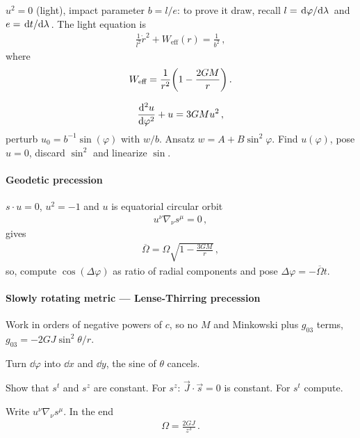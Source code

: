 \documentclass[main.tex]{subfiles}
\begin{document}
\(u^2= 0\) (light), impact parameter \(b = l/e\): to prove it draw, recall \(l = \dv*{\varphi }{\lambda }\) and \(e =
\dv*{t}{\lambda }\). 
The light equation is 
%
\begin{align}
\frac{1}{l^2} \dot{r}^2  + W _{\text{eff}} (r)
= \frac{1}{b^2}
\,,
\end{align}
%
where 
%
\begin{align}
W _{\text{eff}} = \frac{1}{r^2} \qty(1 - \frac{2GM}{r})
\,.
\end{align}

%
\begin{align}
\dv[2]{u}{\varphi } + u = 3GM u^2
\,,
\end{align}
%
perturb \(u_0 = b^{-1} \sin(\varphi )\) with \(w/b\). 
Ansatz \(w = A + B \sin^2\varphi \). Find \(u(\varphi )\), 
pose \(u=0\), discard \(\sin^2\) and linearize \(\sin\). 

\paragraph{Geodetic precession}

\(s \cdot u =0\), \(u^2 = -1 \) and \(u\) is equatorial circular orbit
%
\begin{align}
u^{\nu } \nabla_{\nu } s^{\mu } = 0
\,,
\end{align}
%
gives 
%
\begin{align}
\overline{\Omega} = \Omega \sqrt{1 - \frac{3GM}{r}}
\,,
\end{align}
%
so, compute \(\cos(\Delta \varphi )\) as ratio of radial components and pose \(\Delta \varphi = - \overline{\Omega} t \). 

\paragraph{Slowly rotating metric --- Lense-Thirring precession}

Work in orders of negative powers of \(c\), so no \(M\) and Minkowski plus \(g_{03} \) terms, \(g_{03} = -2 GJ \sin^2\theta /r\).

Turn \(\dd{\varphi }\) into \(\dd{x}\) and \(\dd{y}\), the sine of \(\theta \) cancels.

Show that \(s^{t}\) and \(s^{z }\) are constant. For \(s^{z}\): \(\vec{J} \cdot \vec{s} = 0\) is constant. For \(s^{t}\) compute.

Write \(u^{\nu } \nabla_{\nu } s^{\mu }\). 
In the end 
%
\begin{align}
\Omega = \frac{2GJ}{z^3}
\,.
\end{align}
\end{document}
